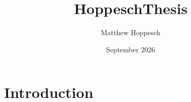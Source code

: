 \documentclass{article}
\title{HoppeschThesis}
\author{Matthew Hoppesch}
\date{September 2026}
\begin{document}
\maketitle

\section{Introduction}
\end{document}
